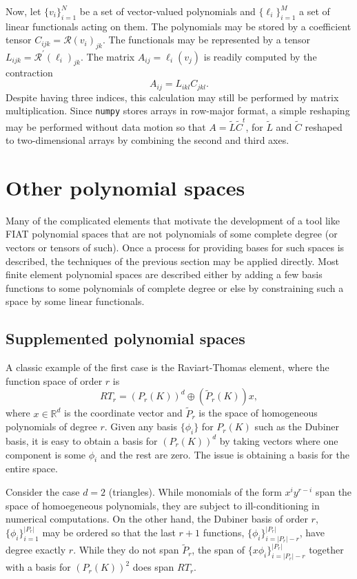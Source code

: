 Now, let \( \{ v_i \}_{i=1}^N \) be a set of vector-valued polynomials
and \( \{ \ell_i \}_{i=1}^M \) a set of linear functionals acting on
them.  The polynomials may be stored by a coefficient tensor \(
C_{ijk} = \mathcal{R}(v_i)_{jk} \).  The functionals may be
represented by a tensor \( L_{ijk} = \mathcal{R}^\prime(\ell_i)_{jk}
\).  The matrix \( A_{ij} = \ell_i(v_j) \) is readily computed by the
contraction
\[
A_{ij} = L_{ikl} C_{jkl}.
\]
Despite having three indices, this calculation may still be performed by
matrix multiplication.  Since \texttt{numpy} stores arrays in row-major
format, a simple reshaping may be performed without data motion
so that \( A = \tilde{L} \tilde{C}^t \), for \( \tilde{L} \) and \(
\tilde{C} \) reshaped to two-dimensional arrays by combining the
second and third axes.



\section{Other polynomial spaces}
Many of the complicated elements that motivate the development of a
tool like FIAT polynomial spaces that are not polynomials of
some complete degree (or vectors or tensors of such).   Once
a process for providing bases for such spaces is described, the
techniques of the previous section may be applied directly.  Most
finite element polynomial spaces are described either by adding a few
basis functions to some polynomials of complete degree or else by
constraining such a space by some linear functionals.

\subsection{Supplemented polynomial spaces}
A classic example of the first case is the Raviart-Thomas element,
where the function space of order \(r \) is
\[
RT_r = \left( P_r(K) \right)^d \oplus \left( \tilde{P}_r(K) \right) x,
\]
where \( x \in \mathbb{R}^d \) is the coordinate vector and
\( \tilde{P}_r \) is the space of homogeneous polynomials of degree \(
r \).
Given any basis \( \{ \phi_i \} \) for \( P_r(K) \) such as the
Dubiner basis, it is easy to obtain a basis for \( (P_r(K))^d \) by
taking vectors where one component is some \( \phi_i \) and the rest
are zero.  The issue is obtaining a basis for the entire space.

Consider the case \( d = 2 \) (triangles).  While monomials of the
form
\(
x^i y^{r-i}
\) span the space of homoegeneous
polynomials, they are subject to ill-conditioning in numerical computations.
On the other hand, the Dubiner basis
of order \( r \), \( \{ \phi_i \}_{i=1}^{|P_r|} \)
may be ordered so that the last \( r + 1 \) functions,
\( \{ \phi_i \}_{i=|P_r|-r}^{|P_r|} \), have degree exactly \( r \).
While they do not span \( \tilde{P}_r \), the span of
\( \{ x \phi_i \}_{i=|P_r|-r}^{|P_r|} \) together with a basis for \(
(P_r(K))^2 \) does span \( RT_r \).

